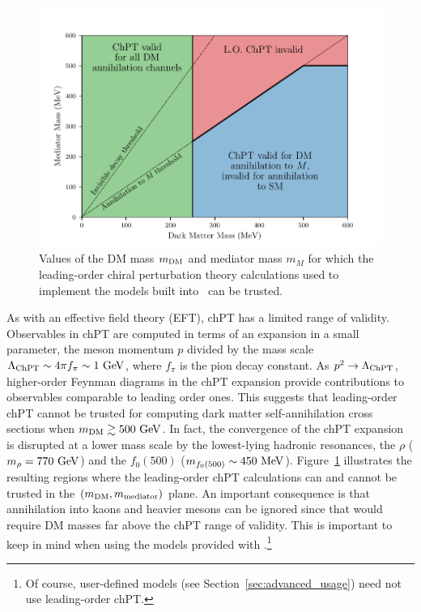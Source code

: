 \begin{figure}
    \centering
    \includegraphics[width=\linewidth]{figures/med_and_dm_mass_phase_diagram.pdf}
    \caption{Values of the DM mass $m_{\mathrm{DM}}$ and mediator mass $m_M$ for which the leading-order chiral perturbation theory calculations used to implement the models built into \hazma\ can be trusted.}
    \label{fig:chpt_validity}
\end{figure}

As with an effective field theory (EFT), chPT has a limited range of validity. Observables in chPT are computed in terms of an expansion in a small parameter, the meson momentum $p$ divided by the mass scale $\Lambda_{\mathrm{ChPT}} \sim 4 \pi f_\pi \sim 1{~\mathrm{GeV}}$, where $f_\pi$ is the pion decay constant. As $p^2 \to \Lambda_{\mathrm{ChPT}}$, higher-order Feynman diagrams in the chPT expansion provide contributions to observables comparable to leading order ones. This suggests that leading-order chPT cannot be trusted for computing dark matter self-annihilation cross sections when $m_{\mathrm{DM}} \gtrsim 500{~\mathrm{GeV}}$. In fact, the convergence of the chPT expansion is disrupted at a lower mass scale by the lowest-lying hadronic resonances, the $\rho$ ($m_\rho = 770{~\mathrm{GeV}}$) and the $f_0(500)$ ($m_{f_0(500)} \sim 450{~\mathrm{MeV}}$). Figure~\ref{fig:chpt_validity} illustrates the resulting regions where the leading-order chPT calculations can and cannot be trusted in the $(m_{\mathrm{DM}}, m_{\mathrm{mediator}})$ plane. An important consequence is that annihilation into kaons and heavier mesons can be ignored since that would require DM masses far above the chPT range of validity. This is important to keep in mind when using the models provided with \hazma.\footnote{Of course, user-defined models (see Section~\ref{sec:advanced_usage}) need not use leading-order chPT.}

